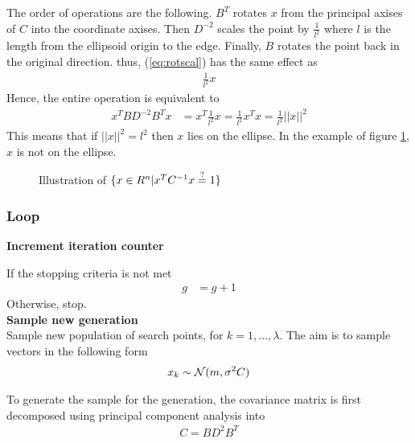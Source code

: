 The order of operations are the following. 
$B^{T}$ rotates $x$ from the principal axises of $C$
into the coordinate axises. Then $D^{-2}$ scales the point by $\frac{1}{l^2}$ where
$l$ is the length from the ellipsoid origin to the edge. Finally, $B$ rotates the point 
back in the original direction. thus, (\ref{eq:rotscal}) has the same effect as
\begin{align}
\frac{1}{l^2} x
\end{align}
Hence, the entire operation is equivalent to
\begin{align}
x^{T} B D^{-2} B^T x &= x^{T} \frac{1}{l^2} x = \frac{1}{l^2} x^{T} x
= \frac{1}{l^2} ||x||^2
\end{align}
This means that if $||x||^2 = l^2$ then $x$ lies on the ellipse.
In the example of figure \ref{fig:ellipse}, $x$ is not 
on the ellipse.


\begin{figure}[H]
\begin{center}

\end{center}
\begin{center}
\ellipseFigure
\end{center}
\caption{Illustration of $\{x \in R^{n} | x^{T} C^{-1} x \stackrel{?}{=} 1\}$ \label{fig:ellipse}}
\end{figure}

\subsubsection{Loop}

\textbf{Increment iteration counter}

If the stopping criteria is not met
\begin{align}
g &= g+1
\end{align}
Otherwise, stop.\\


\textbf{Sample new generation}\\
Sample new population of search points, for $k = 1, \dots, \lambda$.
The aim is to sample vectors in the following form
\begin{align}
x_{k} \sim \mathcal{N}(m, \sigma^2 C)
\end{align}


To generate the sample for the generation, the covariance matrix is first 
decomposed using principal component analysis into
\begin{align}
C = B D^2 B^{T}
\end{align}

